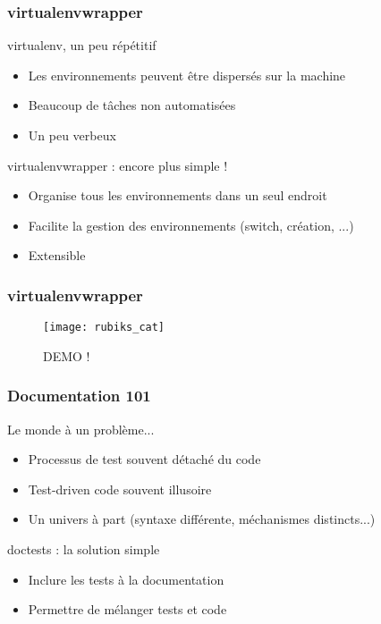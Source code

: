 \documentclass{beamer}
\begin{document}
\begin{frame}
  \frametitle{virtualenvwrapper}

  \begin{block}{virtualenv, un peu répétitif}
    \begin{itemize}
    \item Les environnements peuvent être dispersés sur la machine
    \item Beaucoup de tâches non automatisées
    \item Un peu verbeux
    \end{itemize}
  \end{block}

  \begin{block}{virtualenvwrapper : encore plus simple !}
    \begin{itemize}
    \item Organise tous les environnements dans un seul endroit
    \item Facilite la gestion des environnements (switch, création, ...)
    \item Extensible
    \end{itemize}
  \end{block}

\end{frame}

\begin{frame}
  \frametitle{virtualenvwrapper}

  \begin{figure}[!h]
    \centering
    \texttt{[image: rubiks\_cat]}
    \caption{DEMO !}
    \label{fig:virtualenvwrapperdemo}
  \end{figure}

\end{frame}

\begin{frame}
  \frametitle{Documentation 101}

  \begin{block}{Le monde à un problème...}
    \begin{itemize}
    \item Processus de test souvent détaché du code
    \item Test-driven code souvent illusoire
    \item Un univers à part (syntaxe différente, méchanismes
      distincts...)
    \end{itemize}
  \end{block}

  \begin{block}{doctests : la solution simple}
    \begin{itemize}
    \item Inclure les tests à la documentation
    \item Permettre de mélanger tests et code
    \end{itemize}
  \end{block}

\end{frame}
\end{document}
